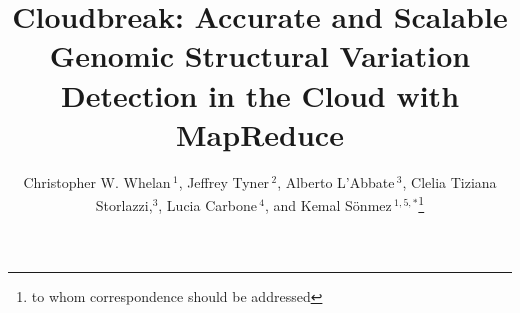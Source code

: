 \documentclass{bioinfo}
\newcommand{\todo}[1]{}
\begin{document}

\title[Cloudbreak]{Cloudbreak: Accurate and Scalable Genomic Structural Variation Detection in the Cloud with MapReduce}
\author[Whelan \textit{et~al}]{Christopher W. Whelan\,$^{1}$, Jeffrey Tyner\,$^{2}$, Alberto L'Abbate\,$^{3}$, Clelia Tiziana Storlazzi,$^{3}$, Lucia Carbone\,$^{4}$, and Kemal S\"onmez\,$^{1,5,*}$\footnote{to whom correspondence should be addressed}}
\address{$^{1}$Institute on Development and Disability and Center for Spoken Language Understanding, Oregon Health \& Science University (OHSU), Portland, OR, USA \\
$^{2}$ Program in Molecular and Cellular Biosciences, OHSU\todo{Oregon Health \& Science University}, Portland, OR, USA \\
$^{3}$ Department of Biology, University of Bari ``Aldo Moro'', Via G. Amendola 165/A, 70126, Bari, Italy \\
$^{4}$ Behavioral Neuroscience Department, OHSU\todo{Oregon Health \& Science University}, Portland, OR, USA \\
$^{5}$ Department of Medical Informatics \& Clinical Epidemiology, OHSU\todo{Oregon Health \& Science University}, Portland, OR, USA 
}



\maketitle
\end{document}
